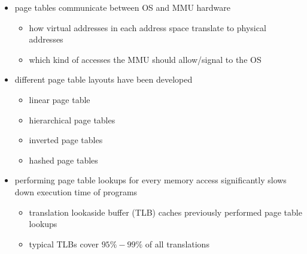 \begin{summary}
  \begin{itemize}
    \item page tables communicate between OS and MMU hardware
    \begin{itemize}
      \item how virtual addresses in each address space translate to physical addresses
      \item which kind of accesses the MMU should allow/signal to the OS
    \end{itemize}
    \item different page table layouts have been developed
    \begin{itemize}
      \item linear page table
      \item hierarchical page tables
      \item inverted page tables
      \item hashed page tables
    \end{itemize}
    \item performing page table lookups for every memory access significantly slows down execution time of programs
    \begin{itemize}
      \item translation lookaside buffer (TLB) caches previously performed page table lookups
      \item typical TLBs cover $ 95\%-99\% $ of all translations
    \end{itemize}
  \end{itemize}
\end{summary}
